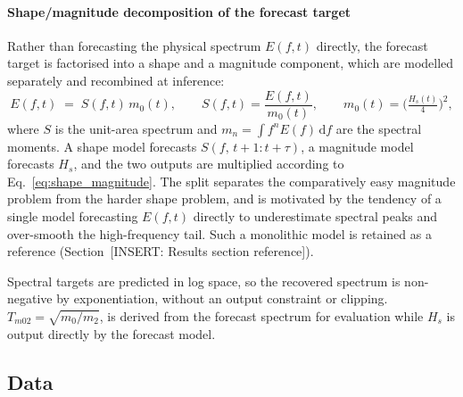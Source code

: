 \paragraph{Shape/magnitude decomposition of the forecast target}
Rather than forecasting the physical spectrum $E(f,t)$ directly, the forecast target is factorised into a shape and a magnitude component, which are modelled separately and recombined at inference:
\begin{equation}
E(f,t) \;=\; S(f,t)\, m_0(t), \qquad
S(f,t) = \frac{E(f,t)}{m_0(t)}, \qquad
m_0(t) = \Big(\tfrac{H_s(t)}{4}\Big)^{2},
\label{eq:shape_magnitude}
\end{equation}
where $S$ is the unit-area spectrum and $m_n = \int f^n E(f)\,\mathrm{d}f$ are the spectral moments. A shape model forecasts $S(f,\,t+1{:}t+\tau)$, a magnitude model forecasts $H_s$, and the two outputs are multiplied according to Eq.~\eqref{eq:shape_magnitude}. The split separates the comparatively easy magnitude problem from the harder shape problem, and is motivated by the tendency of a single model forecasting $E(f,t)$ directly to underestimate spectral peaks and over-smooth the high-frequency tail. Such a monolithic model is retained as a reference (Section~[INSERT: Results section reference]).

Spectral targets are predicted in log space, so the recovered spectrum is non-negative by exponentiation, without an output constraint or clipping. $T_{m02} = \sqrt{m_0/m_2}$, is derived from the forecast spectrum for evaluation while $H_s$ is output directly by the forecast model.

\subsection{Data}
\label{sec:data}

